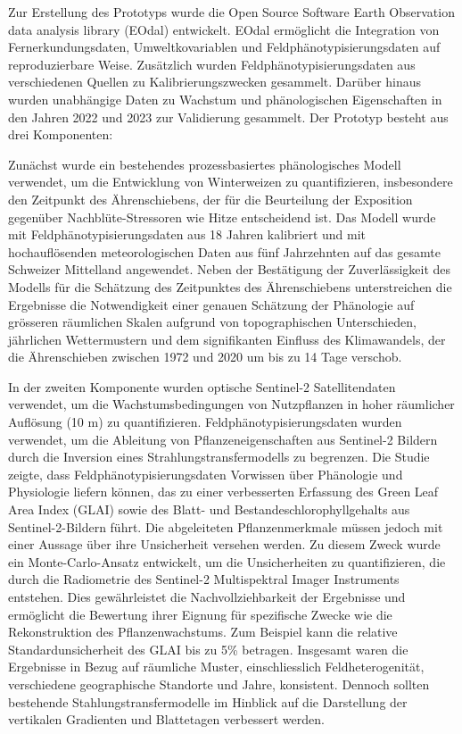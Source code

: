 Zur Erstellung des Prototyps wurde die Open Source Software Earth Observation data analysis library (EOdal) entwickelt. EOdal ermöglicht die Integration von Fernerkundungsdaten, Umweltkovariablen und Feldphänotypisierungsdaten auf reproduzierbare Weise. Zusätzlich wurden Feldphänotypisierungsdaten aus verschiedenen Quellen zu Kalibrierungszwecken gesammelt. Darüber hinaus wurden unabhängige Daten zu Wachstum und phänologischen Eigenschaften in den Jahren 2022 und 2023 zur Validierung gesammelt. Der Prototyp besteht aus drei Komponenten:

Zunächst wurde ein bestehendes prozessbasiertes phänologisches Modell verwendet, um die Entwicklung von Winterweizen zu quantifizieren, insbesondere den Zeitpunkt des Ährenschiebens, der für die Beurteilung der Exposition gegenüber Nachblüte-Stressoren wie Hitze entscheidend ist. Das Modell wurde mit Feldphänotypisierungsdaten aus 18 Jahren kalibriert und mit hochauflösenden meteorologischen Daten aus fünf Jahrzehnten auf das gesamte Schweizer Mittelland angewendet. Neben der Bestätigung der Zuverlässigkeit des Modells für die Schätzung des Zeitpunktes des Ährenschiebens unterstreichen die Ergebnisse die Notwendigkeit einer genauen Schätzung der Phänologie auf grösseren räumlichen Skalen aufgrund von topographischen Unterschieden, jährlichen Wettermustern und dem signifikanten Einfluss des Klimawandels, der die Ährenschieben zwischen 1972 und 2020 um bis zu 14 Tage verschob.

In der zweiten Komponente wurden optische Sentinel-2 Satellitendaten verwendet, um die Wachstumsbedingungen von Nutzpflanzen in hoher räumlicher Auflösung (10 m) zu quantifizieren. Feldphänotypisierungsdaten wurden verwendet, um die Ableitung von Pflanzeneigenschaften aus Sentinel-2 Bildern durch die Inversion eines Strahlungstransfermodells zu begrenzen. Die Studie zeigte, dass Feldphänotypisierungsdaten Vorwissen über Phänologie und Physiologie liefern können, das zu einer verbesserten Erfassung des Green Leaf Area Index (GLAI) sowie des Blatt- und Bestandeschlorophyllgehalts aus Sentinel-2-Bildern führt. Die abgeleiteten Pflanzenmerkmale müssen jedoch mit einer Aussage über ihre Unsicherheit versehen werden. Zu diesem Zweck wurde ein Monte-Carlo-Ansatz entwickelt, um die Unsicherheiten zu quantifizieren, die durch die Radiometrie des Sentinel-2 Multispektral Imager Instruments entstehen. Dies gewährleistet die Nachvollziehbarkeit der Ergebnisse und ermöglicht die Bewertung ihrer Eignung für spezifische Zwecke wie die Rekonstruktion des Pflanzenwachstums. Zum Beispiel kann die relative Standardunsicherheit des GLAI bis zu 5\% betragen. Insgesamt waren die Ergebnisse in Bezug auf räumliche Muster, einschliesslich Feldheterogenität, verschiedene geographische Standorte und Jahre, konsistent. Dennoch sollten bestehende Stahlungstransfermodelle im Hinblick auf die Darstellung der vertikalen Gradienten und Blattetagen verbessert werden.


